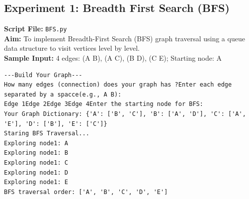 \subsection*{Experiment 1: Breadth First Search (BFS)}
\textbf{Script File:} \texttt{BFS.py} \\[4pt]
\textbf{Aim:} To implement Breadth-First Search (BFS) graph traversal using a queue data structure to visit vertices level by level. \\[4pt]
\textbf{Sample Input:} 4 edges: (A B), (A C), (B D), (C E); Starting node: A \\[6pt]
\begin{tcolorbox}[colback=black!5!white,colframe=black!75!white,title=Terminal Execution Output - Breadth First Search (BFS)]
\begin{verbatim}
---Build Your Graph---
How many edges (connection) does your graph has ?Enter each edge separated by a spacce(e.g., A B):
Edge 1Edge 2Edge 3Edge 4Enter the starting node for BFS: 
Your Graph Dictionary: {'A': ['B', 'C'], 'B': ['A', 'D'], 'C': ['A', 'E'], 'D': ['B'], 'E': ['C']}
Staring BFS Traversal...
Exploring node1: A
Exploring node1: B
Exploring node1: C
Exploring node1: D
Exploring node1: E
BFS traversal order: ['A', 'B', 'C', 'D', 'E']
\end{verbatim}
\end{tcolorbox}

